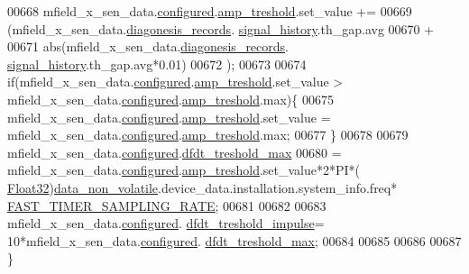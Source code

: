 \begin{DoxyCode}
00668                          mfield\_x\_sen\_data.\hyperlink{a00025_a94b2d1f6ea4ab334c74d24984dd27843}{configured}.\hyperlink{a00021_a4b3bbfb0267daea1432f2603825ade62}{amp\_treshold}.set\_value  +=
00669                          (mfield\_x\_sen\_data.\hyperlink{a00025_a2bd79ce84bbd6b7f50d38954f7ae475e}{diagonesis\_records}.
      \hyperlink{a00019_ab7038f4de1f77b52a7f89e9f77c0b846}{signal\_history}.th\_gap.avg
00670                           +
00671                          abs(mfield\_x\_sen\_data.\hyperlink{a00025_a2bd79ce84bbd6b7f50d38954f7ae475e}{diagonesis\_records}.
      \hyperlink{a00019_ab7038f4de1f77b52a7f89e9f77c0b846}{signal\_history}.th\_gap.avg*0.01)
00672                          );
00673 
00674                          \textcolor{keywordflow}{if}(mfield\_x\_sen\_data.\hyperlink{a00025_a94b2d1f6ea4ab334c74d24984dd27843}{configured}.\hyperlink{a00021_a4b3bbfb0267daea1432f2603825ade62}{amp\_treshold}.set\_value > 
      mfield\_x\_sen\_data.\hyperlink{a00025_a94b2d1f6ea4ab334c74d24984dd27843}{configured}.\hyperlink{a00021_a4b3bbfb0267daea1432f2603825ade62}{amp\_treshold}.max)\{
00675                              mfield\_x\_sen\_data.\hyperlink{a00025_a94b2d1f6ea4ab334c74d24984dd27843}{configured}.\hyperlink{a00021_a4b3bbfb0267daea1432f2603825ade62}{amp\_treshold}.set\_value = 
      mfield\_x\_sen\_data.\hyperlink{a00025_a94b2d1f6ea4ab334c74d24984dd27843}{configured}.\hyperlink{a00021_a4b3bbfb0267daea1432f2603825ade62}{amp\_treshold}.max;
00677                          \}
00678 
00679                       mfield\_x\_sen\_data.\hyperlink{a00025_a94b2d1f6ea4ab334c74d24984dd27843}{configured}.\hyperlink{a00021_adf9a37828e447378b1d533185213316d}{dfdt\_treshold\_max}
00680                         = mfield\_x\_sen\_data.\hyperlink{a00025_a94b2d1f6ea4ab334c74d24984dd27843}{configured}.\hyperlink{a00021_a4b3bbfb0267daea1432f2603825ade62}{amp\_treshold}.set\_value*2*PI*(
      \hyperlink{a00072_a87d38f886e617ced2698fc55afa07637}{Float32})\hyperlink{a00060_a76ac5f917f5308dcd83de0d7c94559fb}{data\_non\_volatile}.device\_data.installation.system\_info.freq*
      \hyperlink{a00021_a3a4dcb8af26a561d90607a41a3745806}{FAST\_TIMER\_SAMPLING\_RATE};
00681 
00682 
00683                      mfield\_x\_sen\_data.\hyperlink{a00025_a94b2d1f6ea4ab334c74d24984dd27843}{configured}.
      \hyperlink{a00021_a3b9c683370c94430a4c6a9d78ce6f5ef}{dfdt\_treshold\_impulse}= 10*mfield\_x\_sen\_data.\hyperlink{a00025_a94b2d1f6ea4ab334c74d24984dd27843}{configured}.
      \hyperlink{a00021_adf9a37828e447378b1d533185213316d}{dfdt\_treshold\_max};
00684 
00685 
00686 
00687                  \}

\end{DoxyCode}

